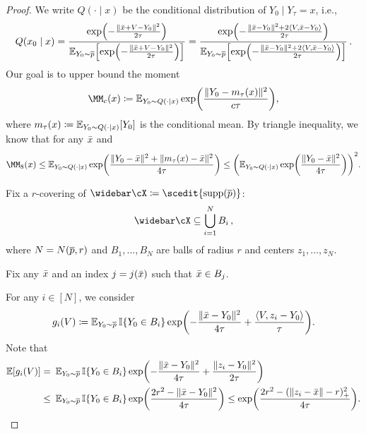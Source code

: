 \begin{proof}
We write $Q(\cdot\mid x)$ be the conditional distribution of $Y_0\mid Y_\tau=x$, i.e.,
\begin{align*}
    Q(x_0\mid x)=\frac{\exp\prn*{-\frac{\nrm{\xbar+V-Y_0}^2}{2\tau}} }{\En_{Y_0\sim \pbar}\brk*{ \exp\prn*{-\frac{\nrm{\xbar+V-Y_0}^2}{2\tau}} }}
    =\frac{\exp\prn*{-\frac{\nrm{\xbar-Y_0}^2+2\tri{V,\xbar-Y_0}}{2\tau}} }{\En_{Y_0\sim \pbar}\brk*{ \exp\prn*{-\frac{\nrm{\xbar-Y_0}^2+2\tri{V,\xbar-Y_0}}{2\tau}} }}\,.
\end{align*}
Our goal is to upper bound the moment
\begin{align*}
    \MM_{c}(x)\deq \En_{Y_0\sim Q(\cdot\mid x)}\exp\prn*{\frac{\nrm{Y_0-m_\tau(x)}^2}{c\tau}},
\end{align*}
where $m_\tau(x)\coloneqq \operatorname{\mathbb{E}}_{Y_0\sim Q(\cdot\mid x)}[Y_0]$ is the conditional mean. By triangle inequality, we know that for any $\bar{x}$ and
\begin{align}\label{pfeq:intrinsic-mgf-decomp}
    \MM_{8}(x)
    \leq \En_{Y_0\sim Q(\cdot\mid x)} \exp\prn*{\frac{\nrm{Y_0-\xbar}^2+\nrm{m_\tau(x)-\xbar}^2}{4\tau}}
    \leq \prn*{ \En_{Y_0\sim Q(\cdot\mid x)}\exp\prn*{\frac{\nrm{Y_0-\xbar}^2}{4\tau}} }^2.
\end{align}


Fix a $r$-covering of $\cXbar \deq \scedit{\supp(\pbar)}$:
\begin{align*}
    \cXbar\subseteq \bigcup_{i=1}^N B_i\,,
\end{align*}
where $N=N(\overline{p},r)$ and $B_1,\dotsc, B_N$ are balls of radius $r$ and centers $z_1,\dotsc,z_N$. 

Fix any $\bar{x}$ and an index $j=j(\bar{x})$ such that $\bar{x}\in B_j$.

For any $i\in[N]$, we consider
\begin{align*}
    g_i(V)\deq \En_{Y_0\sim \pbar} \indic\crl{Y_0\in B_i} \exp\prn*{-\frac{\nrm{\xbar-Y_0}^2}{4\tau}+\frac{\tri{V,z_i-Y_0}}{\tau}}.
\end{align*}
Note that 
\begin{align*}
    \En[g_i(V)]
    =&~\En_{Y_0\sim \pbar} \indic\crl{Y_0\in B_i} \exp\prn*{-\frac{\nrm{\xbar-Y_0}^2}{4\tau}+\frac{\nrm{z_i-Y_0}^2}{2\tau}} \\
    \leq&~ \En_{Y_0\sim \pbar} \indic\crl{Y_0\in B_i} \exp\prn*{\frac{2 r^2-\nrm{\xbar-Y_0}^2}{4\tau}} 
    \leq \exp\prn*{ \frac{2 r^2-(\nrm{z_i-\xbar}-r)_+^2}{4\tau} }.
\end{align*}


\end{proof}
